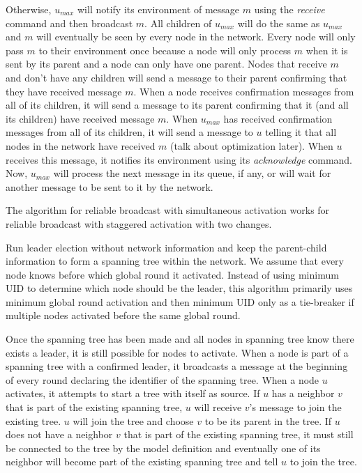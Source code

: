 \documentclass[english]{article}
\begin{document}
Otherwise, $u_{max}$ will notify its environment of message $m$ using the \textit{receive} command and then broadcast $m$. All children of $u_{max}$ will do the same as $u_{max}$ and $m$ will eventually be seen by every node in the network. Every node will only pass $m$ to their environment once because a node will only process $m$ when it is sent by its parent and a node can only have one parent. Nodes that receive $m$ and don't have any children will send a message to their parent confirming that they have received message $m$. When a node receives confirmation messages from all of its children, it will send a message to its parent confirming that it (and all its children) have received message $m$. When $u_{max}$ has received confirmation messages from all of its children, it will send a message to $u$ telling it that all nodes in the network have received $m$ (talk about optimization later). When $u$ receives this message, it notifies its environment using its \textit{acknowledge} command. Now, $u_{max}$ will process the next message in its queue, if any, or will wait for another message to be sent to it by the network.

The algorithm for reliable broadcast with simultaneous activation works for reliable broadcast with staggered activation with two changes.

Run leader election without network information and keep the parent-child information to form a spanning tree within the network. We assume that every node knows before which global round it activated. Instead of using minimum UID to determine which node should be the leader, this algorithm primarily uses minimum global round activation and then minimum UID only as a tie-breaker if multiple nodes activated before the same global round.

Once the spanning tree has been made and all nodes in spanning tree know there exists a leader, it is still possible for nodes to activate. When a node is part of a spanning tree with a confirmed leader, it broadcasts a message at the beginning of every round declaring the identifier of the spanning tree. When a node $u$ activates, it attempts to start a tree with itself as source. If $u$ has a neighbor $v$ that is part of the existing spanning tree, $u$ will receive $v$'s message to join the existing tree. $u$ will join the tree and choose $v$ to be its parent in the tree. If $u$ does not have a neighbor $v$ that is part of the existing spanning tree, it must still be connected to the tree by the model definition and eventually one of its neighbor will become part of the existing spanning tree and tell $u$ to join the tree.
\end{document}
